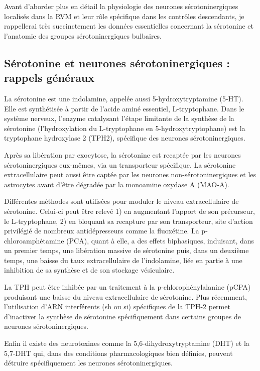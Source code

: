 \documentclass[a4paper,12pt,twoside]{report}
\begin{document}
Avant d'aborder plus en détail la physiologie des neurones sérotoninergiques localisés dans la RVM et leur rôle spécifique dans les contrôles descendants, je rappellerai très succinctement les données essentielles concernant la sérotonine et l'anatomie des groupes sérotoninergiques bulbaires.

\subsection{Sérotonine et neurones sérotoninergiques : rappels généraux}
\label{5-HT et neurones 5-HT : rappels généraux}

La sérotonine est une indolamine, appelée aussi 5-hydroxytryptamine (5-HT). Elle est synthétisée à partir de l’acide aminé essentiel, L-tryptophane. Dans le système nerveux, l’enzyme catalysant l’étape limitante de la synthèse de la sérotonine (l’hydroxylation du L-tryptophane en 5-hydroxytryptophane) est la tryptophane hydroxylase 2 (TPH2), spécifique des neurones sérotoninergiques.

Après sa libération par exocytose, la sérotonine est recaptée par les neurones sérotoninergiques eux-mêmes, via un transporteur spécifique. La sérotonine extracellulaire peut aussi être captée par les neurones non-sérotoninergiques et les astrocytes avant d’être dégradée par la monoamine oxydase A (MAO-A).

Différentes méthodes sont utilisées pour moduler le niveau extracellulaire de sérotonine. Celui-ci peut être relevé 1) en augmentant l’apport de son précurseur, le L-tryptophane, 2) en bloquant sa recapture par son transporteur, site d’action privilégié de nombreux antidépresseurs comme la fluoxétine. La p-chloroamphétamine (PCA), quant à elle, a des effets biphasiques, induisant, dans un premier temps, une libération massive de sérotonine puis, dans un deuxième temps, une baisse du taux extracellulaire de l’indolamine, liée en partie à une inhibition de sa synthèse et de son stockage vésiculaire.
 
La TPH peut être inhibée par un traitement à la p-chlorophénylalanine (pCPA) produisant une baisse du niveau extracellulaire de sérotonine. Plus récemment, l’utilisation d’ARN interférents (sh ou si) spécifiques de la TPH-2 permet d’inactiver la synthèse de sérotonine spécifiquement dans certains groupes de neurones sérotoninergiques.

Enfin il existe des neurotoxines comme la 5,6-dihydroxytryptamine (DHT) et la 5,7-DHT qui, dans des conditions pharmacologiques bien définies, peuvent détruire spécifiquement les neurones sérotoninergiques.
\end{document}
